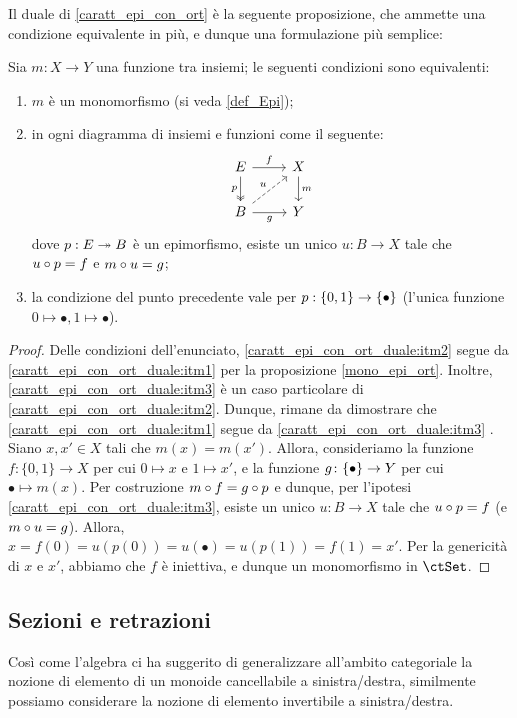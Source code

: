 Il duale di \ref{caratt_epi_con_ort} è la seguente proposizione, che ammette una condizione equivalente in più, e dunque una formulazione più semplice:
\begin{proposition}\label{caratt_epi_con_ort_duale}
	Sia \(m : X\to Y\) una funzione tra insiemi; le seguenti condizioni sono equivalenti:
	\begin{enumerate}
		\item\label{caratt_epi_con_ort_duale:itm1} \(m\) è un monomorfismo (si veda \ref{def_Epi});
		\item\label{caratt_epi_con_ort_duale:itm2} in ogni diagramma di insiemi e funzioni come il seguente:
		      \[\begin{tikzcd}
				      E \ar[r, "f"]\ar[d, two heads, "p"']& X \ar[d, "m"]\\
				      B \ar[r, "g"'] \ar[ur, dashed, "u"]& Y
			      \end{tikzcd}\]
		      dove \(p : E\twoheadrightarrow B\) è un epimorfismo, esiste un unico \(u : B\to X\) tale che \(u\circ p = f\) e \(m\circ u = g\);
		\item\label{caratt_epi_con_ort_duale:itm3} la condizione del punto precedente vale per \(p : \{0,1\} \to \{\bullet\}\) (l'unica funzione \(0\mapsto\bullet, 1\mapsto\bullet\)).
	\end{enumerate}
\end{proposition}
\begin{proof}
	Delle condizioni dell'enunciato, \ref{caratt_epi_con_ort_duale:itm2} segue da \ref{caratt_epi_con_ort_duale:itm1} per la proposizione \ref{mono_epi_ort}.
	Inoltre, \ref{caratt_epi_con_ort_duale:itm3} \`e un caso particolare di \ref{caratt_epi_con_ort_duale:itm2}.
	Dunque, rimane da dimostrare che \ref{caratt_epi_con_ort_duale:itm1} segue da \ref{caratt_epi_con_ort_duale:itm3} .
	Siano \(x, x' \in X\) tali che \(m(x) = m(x')\).
	Allora, consideriamo la funzione \(f \colon \{0, 1\} \to X\) per cui \(0 \mapsto x\) e \(1 \mapsto x'\),
	e la funzione \(g \colon \{\bullet\} \to Y\) per cui \(\bullet \mapsto m(x)\).
	Per costruzione \(m \circ f = g \circ p\) e dunque, per l'ipotesi \ref{caratt_epi_con_ort_duale:itm3}, esiste un unico \(u : B\to X\) tale che \(u\circ p = f\) (e \(m\circ u = g\)).
	Allora, \(x = f(0) = u(p(0)) = u(\bullet) = u(p(1)) = f(1) = x'\).
	Per la genericit\`a di \(x\) e \(x'\), abbiamo che \(f\) \`e iniettiva,
	e dunque un monomorfismo in \(\ctSet\).
\end{proof}

\subsection{Sezioni e retrazioni}\label{sec_sezretraz}
Così come l'algebra ci ha suggerito di generalizzare all'ambito categoriale la nozione di elemento di un monoide cancellabile a sinistra/destra,
similmente possiamo considerare la nozione di elemento invertibile a sinistra/destra.

